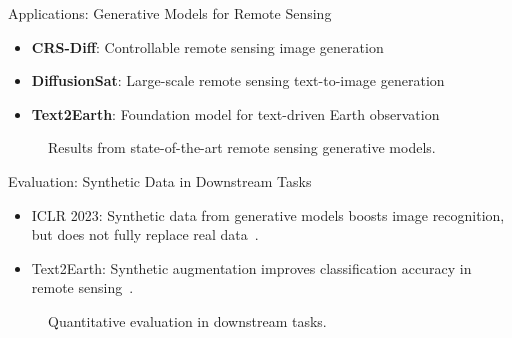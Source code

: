 \begin{refsection}
\begin{frame}{Applications: Generative Models for Remote Sensing}
  \begin{itemize}
    \item \textbf{CRS-Diff}: Controllable remote sensing image generation~\parencite{tang2024crsdiff}
    \item \textbf{DiffusionSat}: Large-scale remote sensing text-to-image generation~\parencite{diffusionset2024}
    \item \textbf{Text2Earth}: Foundation model for text-driven Earth observation~\parencite{text2earth2025}
  \end{itemize}
  \begin{figure}
    \centering
    \caption*{\scriptsize Results from state-of-the-art remote sensing generative models.}
  \end{figure}
  \bottomleftrefs
\end{frame}
\end{refsection}

\begin{refsection}
\begin{frame}{Evaluation: Synthetic Data in Downstream Tasks}
  \begin{itemize}
    \item ICLR 2023: Synthetic data from generative models boosts image recognition, but does not fully replace real data~\parencite{cherti2023synthetic}.
    \item Text2Earth: Synthetic augmentation improves classification accuracy in remote sensing~\parencite{text2earth2025}.
  \end{itemize}
  \begin{figure}
    \centering
    \caption*{\scriptsize Quantitative evaluation in downstream tasks.}
  \end{figure}
  \bottomleftrefs
\end{frame}
\end{refsection}

